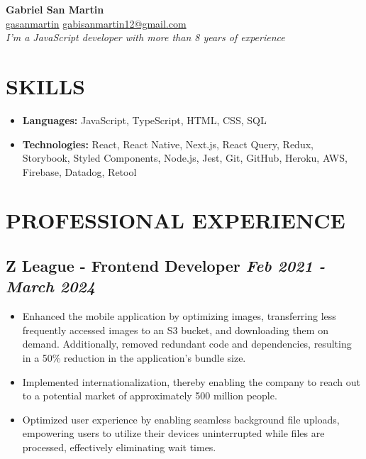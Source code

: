 \documentclass[10pt, a4paper]{article}
\begin{document}
\begin{center}
    \textbf{\huge Gabriel San Martin}
    \\
    \small
    \faLinkedin \hspace{.5pt} \href{https://www.linkedin.com/in/gasanmartin}{gasanmartin}
    \vline \hspace{.5pt}
    \faEnvelope \hspace{.5pt} \href{mailto:gabisanmartin12@gmail.com}{gabisanmartin12@gmail.com}
    \\
    \textit{I'm a JavaScript developer with more than 8 years of experience}
\end{center}

\section{SKILLS}

\begin{itemize}
    \setlength\itemsep{0em}
    \item \textbf{Languages:} JavaScript, TypeScript, HTML, CSS, SQL
    \item \textbf{Technologies:} React, React Native, Next.js, React Query, Redux, Storybook, Styled Components, Node.js, Jest, Git, GitHub, Heroku, AWS, Firebase, Datadog, Retool
\end{itemize}

\section{PROFESSIONAL EXPERIENCE}

\subsection*{Z League - Frontend Developer \hfill \small \textit{Feb 2021 - March 2024}}

\begin{itemize}
    \setlength\itemsep{0em}
    \item Enhanced the mobile application by optimizing images, transferring less frequently accessed images to an S3 bucket, and downloading them on demand. Additionally, removed redundant code and dependencies, resulting in a 50\% reduction in the application's bundle size.
    \item Implemented internationalization, thereby enabling the company to reach out to a potential market of approximately 500 million people.
    \item Optimized user experience by enabling seamless background file uploads, empowering users to utilize their devices uninterrupted while files are processed, effectively eliminating wait times.
\end{itemize}
\end{document}
